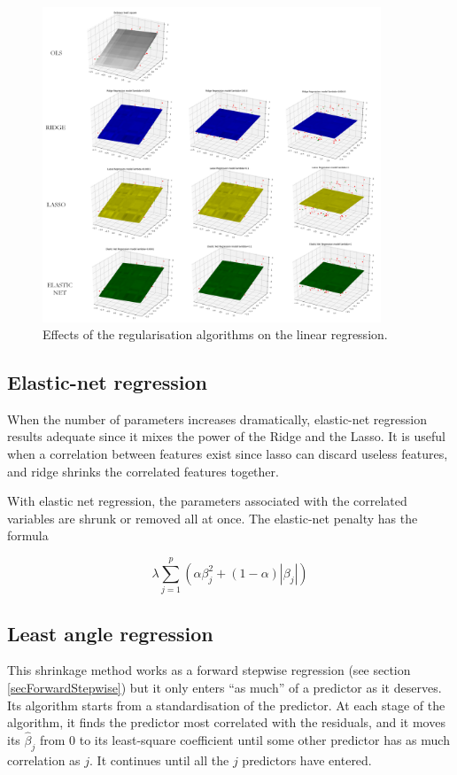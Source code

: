 \begin{figure}[hbt!]
\centering
\includegraphics[width=0.9\textwidth]{SectionLetsMath/linearRegression_figures/fig_regularisation.png}
\captionsetup{type=figure}
\caption{Effects of the regularisation algorithms on the linear regression.}
\label{fig_regularisation}
\end{figure}


\subsection{Elastic-net regression}
When the number of parameters increases dramatically, elastic-net regression results adequate since it mixes the power of the Ridge and the Lasso. It is useful when a correlation between features exist since lasso can discard useless features, and ridge shrinks the correlated features together.\par

With elastic net regression, the parameters associated with the correlated variables are shrunk or removed all at once. The elastic-net penalty has the formula

\begin{equation}
\lambda\sum_{j=1}^{p}\left(\alpha\beta_j^2+\left(1-\alpha\right)\left|\beta_j\right|\right)
\label{eq_elasticnet}
\end{equation}

\subsection{Least angle regression}
This shrinkage method works as a forward stepwise regression (see section \ref{secForwardStepwise}) but it only enters “as much” of a predictor as it deserves. Its algorithm starts from a standardisation of the predictor. At each stage of the algorithm, it finds the predictor most correlated with the residuals, and it moves its ${\hat{\beta}}_j$ from 0 to its least-square coefficient until some other predictor has as much correlation as $j$. It continues until all the $j$ predictors have entered. 

